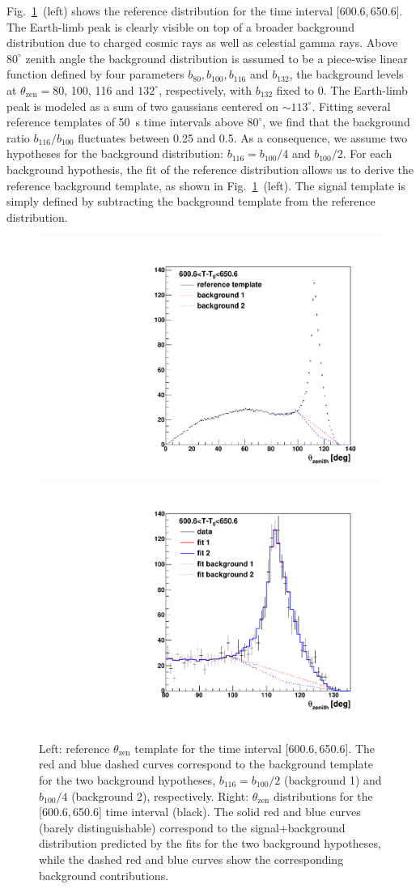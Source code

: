 \documentclass[preprint]{aastex631}
\begin{document}
Fig.~\ref{fig:trigger_filter_efficiency_template}~(left) shows the reference distribution for the time interval [600.6,\,650.6]. The Earth-limb peak is clearly visible on top of a broader background distribution due to charged cosmic rays as well as celestial gamma rays. Above $80^\circ$ zenith angle the background distribution is assumed to be a piece-wise linear function defined by four parameters $b_{80}, b_{100}, b_{116}$ and $b_{132}$, the background levels at $\theta_\mathrm{zen} = 80$, 100, 116 and $132^\circ$, respectively, with $b_{132}$ fixed to 0. The Earth-limb peak is modeled as a sum of two gaussians centered on $\sim 113^\circ$. Fitting several reference templates of 50~s time intervals above $80^\circ$, we find that the background ratio $b_{116}/b_{100}$ fluctuates between 0.25 and 0.5. As a consequence, we assume two hypotheses for the background distribution: $b_{116} = b_{100}/4$ and $b_{100}/2$. For each background hypothesis, the fit of the reference distribution allows us to derive the reference background template, as shown in Fig.~\ref{fig:trigger_filter_efficiency_template}~(left). The signal template is simply defined by subtracting the background template from the reference distribution.

\begin{figure}[h]
    \centering    
    \includegraphics[width=0.45\linewidth]{paper2_analibtemplate_logemin_1p60_600p61_650p61_sc0.pdf}
    \includegraphics[width=0.45\linewidth]{paper2_analibtemplate_logemin_1p60_600p61_650p61_sc1.pdf}
    \caption{Left: reference $\theta_\mathrm{zen}$ template for the  time interval [600.6,\,650.6].  The red and blue dashed curves correspond to the background template for the two background hypotheses, $b_{116} = b_{100}/2$ (background 1) and $b_{100}/4$ (background 2), respectively. Right: $\theta_\mathrm{zen}$ distributions for the [600.6,\,650.6] time interval (black). The solid red and blue curves (barely distinguishable) correspond to the signal+background distribution predicted by the fits for the two background hypotheses, while the dashed red and blue curves show the corresponding background contributions.}
    \label{fig:trigger_filter_efficiency_template}
\end{figure}
\end{document}
